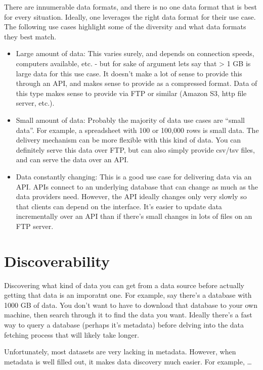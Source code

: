 \documentclass[author-year, review, 11pt]{components/elsarticle} %
\def\tightlist{}
\begin{document}
There are innumerable data formats, and there is no one data format that
is best for every situation. Ideally, one leverages the right data
format for their use case. The following use cases highlight some of the
diversity and what data formats they best match.

\begin{itemize}
\tightlist
\item
  Large amount of data: This varies surely, and depends on connection
  speeds, computers available, etc. - but for sake of argument lets say
  that \textgreater{} 1 GB is large data for this use case. It doesn't
  make a lot of sense to provide this through an API, and makes sense to
  provide as a compressed format. Data of this type makes sense to
  provide via FTP or similar (Amazon S3, http file server, etc.).
\item
  Small amount of data: Probably the majority of data use cases are
  ``small data''. For example, a spreadsheet with 100 or 100,000 rows is
  small data. The delivery mechanism can be more flexible with this kind
  of data. You can definitely serve this data over FTP, but can also
  simply provide csv/tsv files, and can serve the data over an API.
\item
  Data constantly changing: This is a good use case for delivering data
  via an API. APIs connect to an underlying database that can change as
  much as the data providers need. However, the API ideally changes only
  very slowly so that clients can depend on the interface. It's easier
  to update data incrementally over an API than if there's small changes
  in lots of files on an FTP server.
\end{itemize}

\hypertarget{discoverability}{%
\section{Discoverability}\label{discoverability}}

Discovering what kind of data you can get from a data source before
actually getting that data is an imporatnt one. For example, say there's
a database with 1000 GB of data. You don't want to have to download that
database to your own machine, then search through it to find the data
you want. Ideally there's a fast way to query a database (perhaps it's
metadata) before delving into the data fetching process that will likely
take longer.

Unfortunately, most datasets are very lacking in metadata. However, when
metadata is well filled out, it makes data discovery much easier. For
example, \ldots{}
\end{document}
